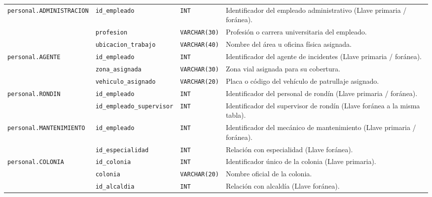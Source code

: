 \begin{longtable}{|p{3.2cm}|p{2.7cm}|p{3.0cm}|p{6.0cm}|}
	\texttt{personal.ADMINISTRACION} & \texttt{id\_empleado} & \texttt{INT} & Identificador del empleado administrativo (Llave primaria / foránea). \\ \cline{2-4}
	& \texttt{profesion} & \texttt{VARCHAR(30)} & Profesión o carrera universitaria del empleado. \\ \cline{2-4}
	& \texttt{ubicacion\_trabajo} & \texttt{VARCHAR(40)} & Nombre del área u oficina física asignada. \\ \hline
	
	\texttt{personal.AGENTE} & \texttt{id\_empleado} & \texttt{INT} & Identificador del agente de incidentes (Llave primaria / foránea). \\ \cline{2-4}
	& \texttt{zona\_asignada} & \texttt{VARCHAR(30)} & Zona vial asignada para su cobertura. \\ \cline{2-4}
	& \texttt{vehiculo\_asignado} & \texttt{VARCHAR(20)} & Placa o código del vehículo de patrullaje asignado. \\ \hline
	
	\texttt{personal.RONDIN} & \texttt{id\_empleado} & \texttt{INT} & Identificador del personal de rondín (Llave primaria / foránea). \\ \cline{2-4}
	& \texttt{id\_empleado\_supervisor} & \texttt{INT} & Identificador del supervisor de rondín (Llave foránea a la misma tabla). \\ \hline
	
	\texttt{personal.MANTENIMIENTO} & \texttt{id\_empleado} & \texttt{INT} & Identificador del mecánico de mantenimiento (Llave primaria / foránea). \\ \cline{2-4}
	& \texttt{id\_especialidad} & \texttt{INT} & Relación con especialidad (Llave foránea). \\ \hline
	
	\texttt{personal.COLONIA} & \texttt{id\_colonia} & \texttt{INT} & Identificador único de la colonia (Llave primaria). \\ \cline{2-4}
	& \texttt{colonia} & \texttt{VARCHAR(20)} & Nombre oficial de la colonia. \\ \cline{2-4}
	& \texttt{id\_alcaldia} & \texttt{INT} & Relación con alcaldía (Llave foránea). \\ \hline
	

\end{longtable}
